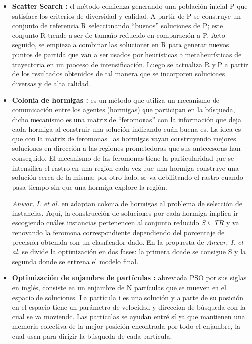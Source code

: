\begin{itemize}
\item \textbf{Scatter Search \cite{talbi2009metaheuristics,glover1977heuristics}:}
el método comienza generando una población inicial P que satisface los criterios de diversidad y calidad. A partir de P se construye un conjunto de referencia R seleccionando ``buenos'' soluciones de P; este conjunto R tiende a ser de tamaño reducido en comparación a P. Acto seguido, se empieza a combinar las solucioner en R para generar nuevos puntos de partida que van a ser usados por heurísticas o metaheurísticas de trayectoria en un proceso de intensificación. Luego se actualiza R y P a partir de los resultados obtenidos de tal manera que se incorporen soluciones diversas y de alta calidad.

\item \textbf{Colonia de hormigas \cite{talbi2009metaheuristics,dorigo1992optimization}:}
es un método que utiliza un mecanismo de comunicación entre los agentes (hormigas) que participan en la búsqueda, dicho mecanismo es una matriz de ``feromonas'' con la información que deja cada hormiga al construir una solución indicando cuán buena es. La idea es que con la matriz de feromonas, las hormigas vayan construyendo mejores soluciones en dirección a las regiones prometedoras que sus antecesoras han conseguido. El mecanismo de las feromonas tiene la particularidad que se intensifica el rastro en una región cada vez que una hormiga construye una solución cerca de la misma; por otro lado, se va debilitando el rastro cuando pasa tiempo sin que una hormiga explore la región.

\emph{Anwar, I. et al.} en \cite{anwar2015instance,anwar2015adr} adaptan colonia de hormigas al problema de selección de instancias. Aquí, la construcción de soluciones por cada hormiga implica ir escogiendo cuáles instancias pertenencen al conjunto reducido $S \subseteq TR$ y va renovando la feromona correspondiente dependiendo del porcentaje de precisión obtenida con un clasificador dado. En la propuesta de \emph{Anwar, I. et al.} se divide la optimización en dos fases: la primera donde se consigue S y la segunda donde se entrena el modelo final.

\item \textbf{Optimización de enjambre de partículas \cite{talbi2009metaheuristics,eberhart2001swarm}:}
abreviada PSO por sus siglas en inglés, consiste en un enjambre de N partículas que se mueven en el espacio de soluciones. La partícula i es una solución y a parte de su posición en el espacio tiene un parámetro de velocidad y dirección de búsqueda con la cual se va moviendo. Las partículas se ayudan entré sí ya que mantienen una memoria colectiva de la mejor posición encontrada por todo el enjambre, la cual usan para dirigir la búsqueda de cada partícula.


\end{itemize}
